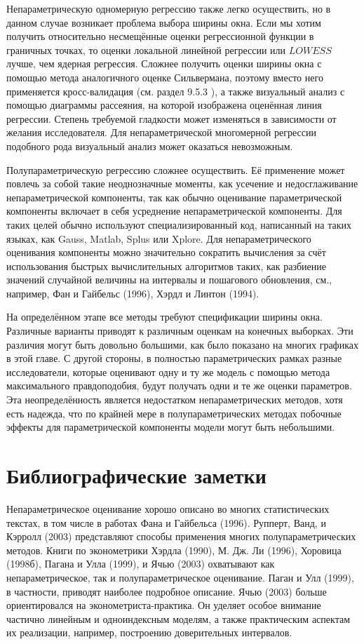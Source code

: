 Непараметрическую одномерную регрессию также легко осуществить, но в данном случае возникает проблема выбора ширины окна. Если мы хотим получить относительно несмещённые оценки регрессионной функции в граничных точках, то оценки локальной линейной регрессии или $LOWESS$ лучше, чем ядерная регрессия. Сложнее получить оценки ширины окна с помощью метода аналогичного оценке Сильвермана, поэтому вместо него применяется кросс-валидация (см. раздел 9.5.3 ), а также визуальный анализ с помощью диаграммы рассеяния, на которой изображена оценённая линия регрессии. Степень требуемой гладкости может изменяться в зависимости от желания исследователя. Для непараметрической многомерной регрессии подобного рода визуальный анализ может оказаться невозможным.

Полупараметрическую регрессию сложнее осуществить. Её применение может повлечь за собой такие неоднозначные моменты, как усечение и недосглаживание непараметрической компоненты, так как обычно оценивание параметрической компоненты включает в себя усреднение непараметрической компоненты. Для таких целей обычно используют специализированный код, написанный на таких языках, как Gauss, Matlab, Splus или Xplore. Для непараметрического оценивания компоненты можно значительно сократить вычисления за счёт использования быстрых вычислительных алгоритмов таких, как разбиение значений случайной величины на интервалы и пошагового обновления, см., например, Фан и Гайбельс (1996), Хэрдл и Линтон (1994).

На определённом этапе все методы требуют спецификации ширины окна. Различные варианты приводят к различным оценкам на конечных выборках. Эти различия могут быть довольно большими, как было показано на многих графиках в этой главе. С другой стороны, в полностью параметрических рамках разные исследователи, которые оценивают одну и ту же модель с помощью метода максимального правдоподобия, будут получать одни и те же оценки параметров. Эта неопределённость является недостатком непараметрических методов, хотя есть надежда, что по крайней мере в полупараметрических методах побочные эффекты для параметрической компоненты модели могут быть небольшими.

\section{Библиографические заметки}

Непараметрическое оценивание хорошо описано во многих статистических текстах, в том числе в работах Фана и Гайбельса (1996). Рупперт, Ванд, и Кэрролл (2003) представляют способы применения многих полупараметрических методов. Книги по эконометрики Хэрдла (1990), М. Дж. Ли (1996), Хоровица (1998б), Пагана и Улла (1999), и Ячью (2003) охватывают как непараметрическое, так и полупараметрическое оценивание. Паган и Улл (1999), в частности, приводят наиболее подробное описание. Ячью (2003) больше ориентировался на эконометриста-практика. Он уделяет особое внимание частично линейным и одноиндексным моделям, а также практическим аспектам их реализации, например, построению доверительных интервалов.

